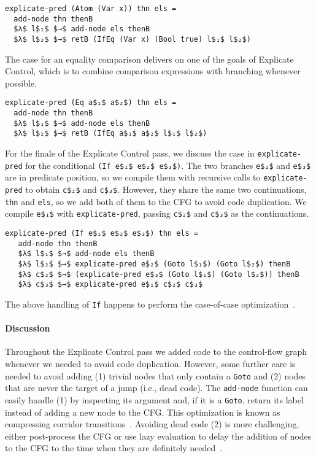 \documentclass[sigplan,screen]{acmart}
\begin{document}
\begin{lstlisting}
explicate-pred (Atom (Var x)) thn els =
  add-node thn thenB
  $λ$ l$₁$ $→$ add-node els thenB
  $λ$ l$₂$ $→$ retB (IfEq (Var x) (Bool true) l$₁$ l$₂$)
\end{lstlisting}

\noindent The case for an equality comparison delivers on one of the
goals of Explicate Control, which is to combine comparison expressions
with branching whenever possible.

\begin{lstlisting}
explicate-pred (Eq a$₁$ a$₂$) thn els =
  add-node thn thenB
  $λ$ l$₁$ $→$ add-node els thenB
  $λ$ l$₂$ $→$ retB (IfEq a$₁$ a$₂$ l$₁$ l$₂$)
\end{lstlisting}

For the finale of the Explicate Control pass, we discuss the case in
\lstinline{explicate-pred} for the conditional \lstinline{(If e$₁$ e$₂$ e$₃$)}.
The two branches \lstinline{e$₂$} and
\lstinline{e$₃$} are in predicate position, so we compile them with
recursive calls to \lstinline{explicate-pred} to obtain
\lstinline{c$₂$} and \lstinline{c$₃$}. However, they share the same
two continuations, \lstinline{thn} and \lstinline{els}, so we add both
of them to the CFG to avoid code duplication. We compile
\lstinline{e$₁$} with \lstinline{explicate-pred}, passing
\lstinline{c$₂$} and \lstinline{c$₃$} as the continuations.

\begin{lstlisting}[basicstyle=\ttfamily\footnotesize]
explicate-pred (If e$₁$ e$₂$ e$₃$) thn els =
   add-node thn thenB
   $λ$ l$₁$ $→$ add-node els thenB
   $λ$ l$₂$ $→$ explicate-pred e$₂$ (Goto l$₁$) (Goto l$₂$) thenB
   $λ$ c$₂$ $→$ (explicate-pred e$₃$ (Goto l$₁$) (Goto l$₂$)) thenB
   $λ$ c$₃$ $→$ explicate-pred e$₁$ c$₂$ c$₃$
\end{lstlisting}

\noindent The above handling of \lstinline{If} happens to perform the
case-of-case optimization~\citep{PEYTONJONES19983}.

\paragraph{Discussion}

Throughout the Explicate Control pass we added code to the
control-flow graph whenever we needed to avoid code
duplication. However, some further care is needed to avoid adding (1)
trivial nodes that only contain a \lstinline{Goto} and (2) nodes that
are never the target of a jump (i.e., dead code). The
\lstinline{add-node} function can easily handle (1) by inspecting its
argument and, if it is a \lstinline{Goto}, return its label instead of
adding a new node to the CFG. This optimization is known as
compressing corridor transitions~\citep{Danvy:2009aa}.  Avoiding dead
code (2) is more challenging, either post-process the CFG or use lazy
evaluation to delay the addition of nodes to the CFG to the time when
they are definitely needed~\citep{Siek:2023tr}.
\end{document}
